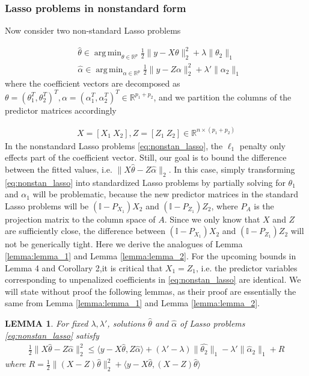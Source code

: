 \documentclass[a4paper]{article}
\DeclareMathOperator*{\argmin}{arg\,min}
\newtheorem{lemma}{LEMMA}
\newcommand{\RR}{\mathbb{R}}
\newcommand{\ra}{\rangle}
\newcommand{\la}{\langle}
\begin{document}
\subsubsection{Lasso problems in nonstandard form}

Now consider two non-standard Lasso problems

\begin{equation}
\begin{aligned}
&\hat{\theta} \in \argmin_{\theta\in\RR^p}\frac{1}{2}\|y-X\theta\|_2^2 + \lambda\|\theta_2\|_1\\
&\hat{\alpha} \in \argmin_{\alpha\in\RR^p} \frac{1}{2}\|y-Z\alpha\|_2^2 + \lambda'\|\alpha_2\|_1
\end{aligned}
\label{eq:nonstan_lasso}
\end{equation}
where the coefficient vectors are decomposed as $\theta = (\theta_1^T ,\theta_2^T)^T, \alpha = (\alpha_1^T, \alpha_2^T)^T \in \RR^{p_1+p_2}$, and we partition the columns of the predictor matrices accordingly 

\begin{align*}
X = [X_1 ~ X_2], Z = [Z_1 ~ Z_2] \in \RR^{n\times (p_1+p_2)}
\end{align*}
In the nonstandard Lasso problems \eqref{eq:nonstan_lasso}, the $\ell_1$ penalty only effects part of the coefficient vector. Still, our goal is to bound the difference between the fitted values, i.e. $\|X\hat{\theta} - Z\hat{\alpha}\|_2$. In this case, simply transforming \eqref{eq:nonstan_lasso} into standardized Lasso problems by partially solving for $\theta_1$ and $\alpha_1$ will be problematic, because the new predictor matrices in the standard Lasso problems will be $(\mathbb{I}-P_{X_1})X_2$ and $(\mathbb{I}-P_{Z_1})Z_2$, where $P_A$ is the projection matrix to the column space of $A$. Since we only know that $X$ and $Z$ are sufficiently close, the difference between $(\mathbb{I}-P_{X_1})X_2$ and $(\mathbb{I}-P_{Z_1})Z_2$ will not be generically tight. Here we derive the analogues of Lemma \ref{lemma:lemma_1} and Lemma \ref{lemma:lemma_2}. For the upcoming bounds in Lemma 4 and Corollary 2,it is critical that $X_1 = Z_1$, i.e. the predictor variables corresponding to unpenalized coefficients in \eqref{eq:nonstan_lasso} are identical. We will state without proof the following lemmas, as their proof are essentially the same from Lemma \ref{lemma:lemma_1} and Lemma \ref{lemma:lemma_2}.

\begin{lemma}
For fixed $\lambda, \lambda'$, solutions $\hat{\theta}$ and $\hat{\alpha}$ of Lasso problems \eqref{eq:nonstan_lasso} satisfy
\begin{align*}
\frac{1}{2}\|X\hat{\theta} - Z\hat{\alpha}\|_2^2 \leq \la y-X\hat{\theta}, Z\hat{\alpha} \ra + (\lambda'-\lambda)\|\hat{\theta_2}\|_1 - \lambda'\|\hat{\alpha}_2\|_1 + R
\end{align*}
where $R= \frac{1}{2}\|(X-Z)\hat{\theta}\|_2^2 + \la y-X\hat{\theta}, (X-Z)\hat{\theta}\ra$
\label{lemma:lemma_3}
\end{lemma}
\end{document}
